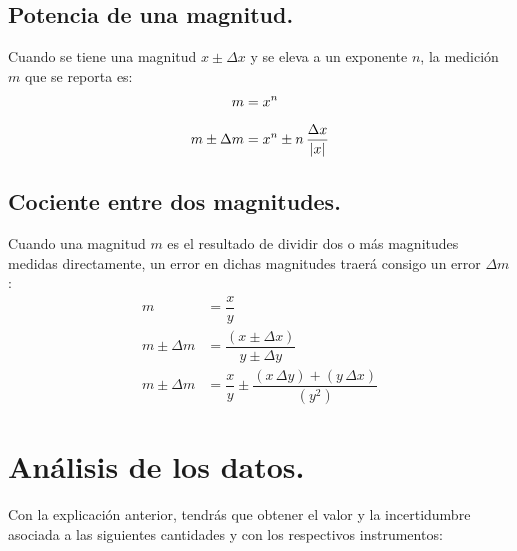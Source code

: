 \documentclass[14pt]{extarticle}
\begin{document}
\subsection*{Potencia de una magnitud.}

Cuando se tiene una magnitud $x \pm \Delta x$ y se eleva a un exponente $n$, la medición $m$ que se reporta es:
\begin{align*}
m &= x^{n} \\[0.5em]
m \pm \Delta m &= x^{n} \pm n \, \dfrac{\Delta x}{\abs{x}}
\end{align*}

\subsection*{Cociente entre dos magnitudes.}

Cuando una magnitud $m$ es el resultado de dividir dos o más magnitudes medidas
directamente, un error en dichas magnitudes traerá consigo un error $\Delta m$:
\begin{align*}
m &= \dfrac{x}{y} \\[0.5em]
m \pm \Delta m &= \dfrac{(x \pm \Delta x)}{y \pm \Delta y} \\[0.5em]
m \pm \Delta m &= \dfrac{x}{y} \pm \dfrac{(x \, \Delta y) + (y \, \Delta x)}{(y^{2})}
\end{align*}

\section{Análisis de los datos.}

Con la explicación anterior, tendrás que obtener el valor y la incertidumbre asociada a las siguientes cantidades y con los respectivos instrumentos:
\end{document}
